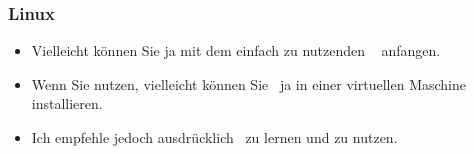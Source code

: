 \documentclass[aspectratio=169,mathserif,notheorems]{beamer}%
\begin{document}
%
\begin{frame}%
\frametitle{Linux}%
%
%
\begin{itemize}%
\item Vielleicht können Sie ja mit dem einfach zu nutzenden \ubuntu\ \linux\cite{CN2020ULB,H2020ULU2E} anfangen.%
\item<2-> Wenn Sie \microsoftWindows\cite{B2023W1IO} nutzen, vielleicht können Sie \ubuntu\ ja in einer virtuellen Maschine installieren.%
\item<3-> Ich empfehle jedoch ausdrücklich \linux\ zu lernen und zu nutzen.%
\end{itemize}%
\end{frame}%
%
\end{document}
